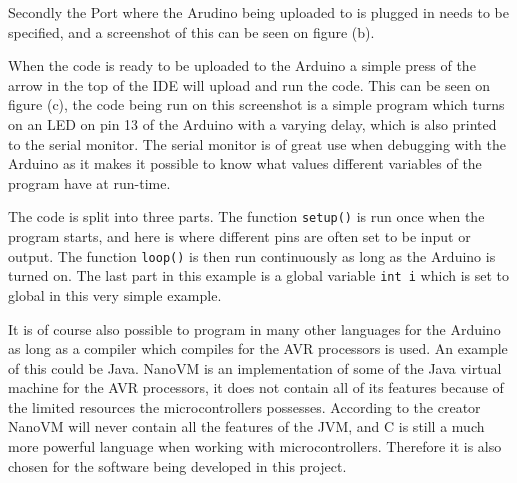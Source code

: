 Secondly the Port where the Arudino being uploaded to is plugged in needs to be specified, and a screenshot of this can be seen on figure  (b).

When the code is ready to be uploaded to the Arduino a simple press of the arrow in the top of the IDE will upload and run the code. 
This can be seen on figure  (c), the code being run on this screenshot is a simple program which turns on an LED on pin 13 of the Arduino with a varying delay, which is also printed to the serial monitor.
The serial monitor is of great use when debugging with the Arduino as it makes it possible to know what values different variables of the program have at run-time.

The code is split into three parts.
The function \texttt{setup()} is run once when the program starts, and here is where different pins are often set to be input or output.
The function \texttt{loop()} is then run continuously as long as the Arduino is turned on. 
The last part in this example is a global variable \texttt{int i} which is set to global in this very simple example.

It is of course also possible to program in many other languages for the Arduino as long as a compiler which compiles for the AVR processors is used.
An example of this could be Java.
NanoVM is an implementation of some of the Java virtual machine for the AVR processors, it does not contain all of its features because of the limited resources the microcontrollers possesses. 
According to the creator NanoVM will never contain all the features of the JVM, and C is still a much more powerful language when working with microcontrollers. 
Therefore it is also chosen for the software being developed in this project.
\cite{NanoVM}
